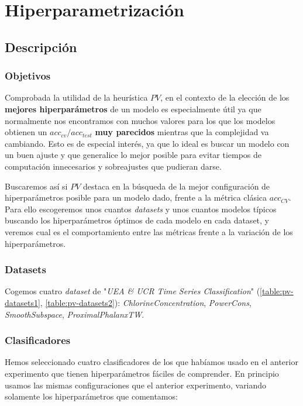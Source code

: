 \section{Hiperparametrización}

\subsection{Descripción}

\subsubsection{Objetivos}

Comprobada la utilidad de la heurística $PV$, en el contexto de la elección de los \textbf{mejores hiperparámetros} de un modelo es especialmente útil ya que normalmente nos encontramos con muchos valores para los que los modelos obtienen un $acc_{cv}/acc_{test}$ \textbf{muy parecidos} mientras que la complejidad va cambiando. Esto es de especial interés, ya que lo ideal es buscar un modelo con un buen ajuste y que generalice lo mejor posible para evitar tiempos de computación innecesarios y sobreajustes que pudieran darse.

Buscaremos así  si $PV$ destaca en la búsqueda de la mejor configuración de hiperparámetros posible para un modelo dado, frente a la métrica clásica $acc_{CV}$. Para ello escogeremos unos cuantos \emph{datasets} y unos cuantos modelos típicos buscando los hiperparámetros óptimos de cada modelo en cada dataset, y veremos cual es el comportamiento entre las métricas frente a la variación de los hiperparámetros.

\subsubsection{Datasets}

Cogemos cuatro \emph{dataset} de "\emph{UEA \& UCR Time Series Classification}" \cite{bagnall2020ts} (\autoref{table:pv-datasets1}, \autoref{table:pv-datasets2}): \emph{ChlorineConcentration}, \emph{PowerCons}, \emph{SmoothSubspace}, \emph{ProximalPhalanxTW}.

\subsubsection{Clasificadores}

Hemos seleccionado cuatro clasificadores de los que habíamos usado en el anterior experimento que tienen hiperparámetros fáciles de comprender. En principio usamos las mismas configuraciones que el anterior experimento, variando solamente los hiperparámetros que comentamos:

